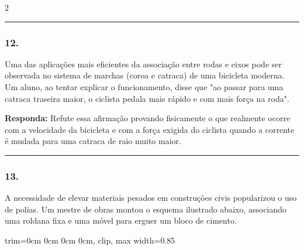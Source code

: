 \documentclass[twoside, 10pt, a4paper]{article}
\newlength{\espacoPreQuestao}
\newlength{\espacoQuestao}
\newcommand{\larguraTikz}{0.85\linewidth} %
\begin{document}
\begin{multicols*}{2}
\noindent\textcolor{CorLinha}{\rule{\linewidth}{0.5pt}}
\par\vspace{\espacoPreQuestao}
\subsubsection*{12.} Uma das aplicações mais eficientes da associação entre rodas e eixos pode ser observada no sistema de marchas (coroa e catraca) de uma bicicleta moderna. Um aluno, ao tentar explicar o funcionamento, disse que "ao passar para uma catraca traseira maior, o ciclista pedala mais rápido e com mais força na roda".
\begin{boxresponda}
\textbf{Responda:} Refute essa afirmação provando fisicamente o que realmente ocorre com a velocidade da bicicleta e com a força exigida do ciclista quando a corrente é mudada para uma catraca de raio muito maior.
\end{boxresponda}
\par\vspace{\espacoQuestao}
\noindent\textcolor{CorLinha}{\rule{\linewidth}{0.5pt}} 
\par\vspace{\espacoPreQuestao}
\subsubsection*{13.} A necessidade de elevar materiais pesados em construções civis popularizou o uso de polias. Um mestre de obras montou o esquema ilustrado abaixo, associando uma roldana fixa e uma móvel para erguer um bloco de cimento.
\begin{center}
\begin{adjustbox}{trim=0cm 0cm 0cm 0cm, clip, max width=\larguraTikz}
\end{adjustbox}
\end{center}
\end{multicols*}
\end{document}
